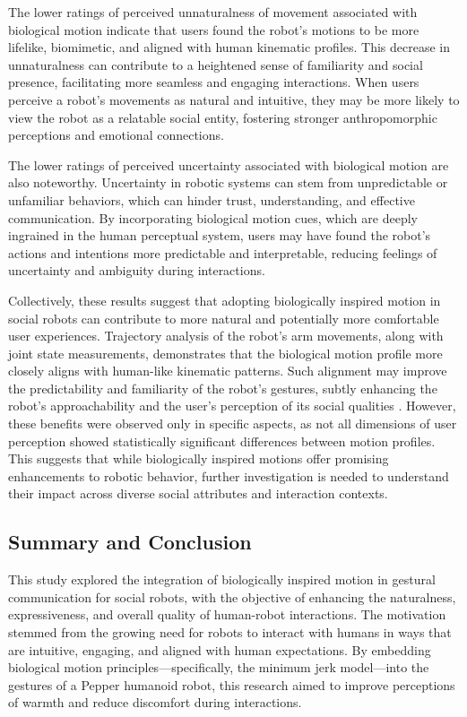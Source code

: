 \documentclass{CSSRforAfrica}
\begin{document}
The lower ratings of perceived unnaturalness of movement associated with biological motion indicate that users found the robot's motions to be more lifelike, biomimetic, and aligned with human kinematic profiles. This decrease in unnaturalness can contribute to a heightened sense of familiarity and social presence, facilitating more seamless and engaging interactions. When users perceive a robot's movements as natural and intuitive, they may be more likely to view the robot as a relatable social entity, fostering stronger anthropomorphic perceptions and emotional connections.

The lower ratings of perceived uncertainty associated with biological motion are also noteworthy. Uncertainty in robotic systems can stem from unpredictable or unfamiliar behaviors, which can hinder trust, understanding, and effective communication. By incorporating biological motion cues, which are deeply ingrained in the human perceptual system, \cite{SimionRegolinBulf08} users may have found the robot's actions and intentions more predictable and interpretable, reducing feelings of uncertainty and ambiguity during interactions.

Collectively, these results suggest that adopting biologically inspired motion in social robots can contribute to more natural and potentially more comfortable user experiences. Trajectory analysis of the robot’s arm movements, along with joint state measurements, demonstrates that the biological motion profile more closely aligns with human-like kinematic patterns. Such alignment may improve the predictability and familiarity of the robot's gestures, subtly enhancing the robot's approachability and the user's perception of its social qualities \cite{Vignoloetal2017}.
However, these benefits were observed only in specific aspects, as not all dimensions of user perception showed statistically significant differences between motion profiles. This suggests that while biologically inspired motions offer promising enhancements to robotic behavior, further investigation is needed to understand their impact across diverse social attributes and interaction contexts.
 

\subsection{Summary and Conclusion}
This study explored the integration of biologically inspired motion in gestural communication for social robots, with the objective of enhancing the naturalness, expressiveness, and overall quality of human-robot interactions. The motivation stemmed from the growing need for robots to interact with humans in ways that are intuitive, engaging, and aligned with human expectations. By embedding biological motion principles—specifically, the minimum jerk model—into the gestures of a Pepper humanoid robot, this research aimed to improve perceptions of warmth and reduce discomfort during interactions.
\end{document}
